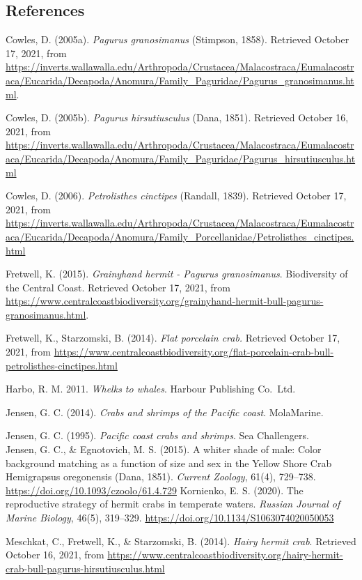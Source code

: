 \documentclass[
]{article}
\begin{document}
\newpage

\hypertarget{references}{%
\subsection{References}\label{references}}

Cowles, D. (2005a). \emph{Pagurus granosimanus} (Stimpson, 1858).
Retrieved October 17, 2021, from
\url{https://inverts.wallawalla.edu/Arthropoda/Crustacea/Malacostraca/Eumalacostraca/Eucarida/Decapoda/Anomura/Family_Paguridae/Pagurus_granosimanus.html}.

Cowles, D. (2005b). \emph{Pagurus hirsutiusculus} (Dana, 1851).
Retrieved October 16, 2021, from
\url{https://inverts.wallawalla.edu/Arthropoda/Crustacea/Malacostraca/Eumalacostraca/Eucarida/Decapoda/Anomura/Family_Paguridae/Pagurus_hirsutiusculus.html}

Cowles, D. (2006). \emph{Petrolisthes cinctipes} (Randall, 1839).
Retrieved October 17, 2021, from
\url{https://inverts.wallawalla.edu/Arthropoda/Crustacea/Malacostraca/Eumalacostraca/Eucarida/Decapoda/Anomura/Family_Porcellanidae/Petrolisthes_cinctipes.html}

Fretwell, K. (2015). \emph{Grainyhand hermit - Pagurus granosimanus}.
Biodiversity of the Central Coast. Retrieved October 17, 2021, from
\url{https://www.centralcoastbiodiversity.org/grainyhand-hermit-bull-pagurus-granosimanus.html}.

Fretwell, K., Starzomski, B. (2014). \emph{Flat porcelain crab.}
Retrieved October 17, 2021, from
\url{https://www.centralcoastbiodiversity.org/flat-porcelain-crab-bull-petrolisthes-cinctipes.html}

Harbo, R. M. 2011. \emph{Whelks to whales}. Harbour Publishing Co.~Ltd.~

Jensen, G. C. (2014). \emph{Crabs and shrimps of the Pacific coast}.
MolaMarine.

Jensen, G. C. (1995). \emph{Pacific coast crabs and shrimps}. Sea
Challengers.\\
Jensen, G. C., \& Egnotovich, M. S. (2015). A whiter shade of male:
Color background matching as a function of size and sex in the Yellow
Shore Crab Hemigrapsus oregonensis (Dana, 1851). \emph{Current Zoology},
61(4), 729--738. \url{https://doi.org/10.1093/czoolo/61.4.729}
Kornienko, E. S. (2020). The reproductive strategy of hermit crabs in
temperate waters. \emph{Russian Journal of Marine Biology}, 46(5),
319--329. \url{https://doi.org/10.1134/S1063074020050053}

Meschkat, C., Fretwell, K., \& Starzomski, B. (2014). \emph{Hairy hermit
crab}. Retrieved October 16, 2021, from
\url{https://www.centralcoastbiodiversity.org/hairy-hermit-crab-bull-pagurus-hirsutiusculus.html}
\end{document}
